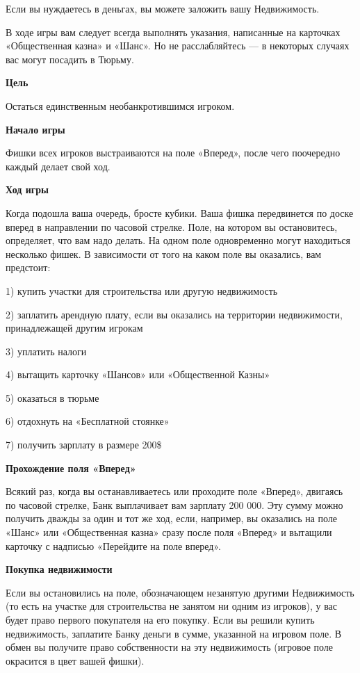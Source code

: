Если вы нуждаетесь в деньгах, вы можете заложить вашу Недвижимость.

В ходе игры вам следует всегда выполнять указания, написанные на карточках «Общественная казна» и «Шанс». Но не расслабляйтесь — в некоторых случаях вас могут посадить в Тюрьму.

{\bf Цель}

Остаться единственным необанкротившимся игроком.

{\bf Начало игры}

Фишки всех игроков выстраиваются на поле «Вперед», после чего поочередно каждый делает свой ход.

{\bf Ход игры}

Когда подошла ваша очередь, бросте кубики. Ваша фишка передвинется по доске вперед в направлении по часовой стрелке. Поле, на котором вы остановитесь, определяет, что вам надо делать. На одном поле одновременно могут находиться несколько фишек. В зависимости от того на каком поле вы оказались, вам предстоит:

1) купить участки для строительства или другую недвижимость

2) заплатить арендную плату, если вы оказались на территории недвижимости, принадлежащей другим игрокам

3) уплатить налоги

4) вытащить карточку «Шансов» или «Общественной Казны»

5) оказаться в тюрьме

6) отдохнуть на «Бесплатной стоянке»

7) получить зарплату в размере 200\$


{\bf Прохождение поля «Вперед»}

Всякий раз, когда вы останавливаетесь или проходите поле «Вперед», двигаясь по часовой стрелке, Банк выплачивает вам зарплату 200 000. Эту сумму можно получить дважды за один и тот же ход, если, например, вы оказались на поле «Шанс» или «Общественная казна» сразу после поля «Вперед» и вытащили карточку с надписью «Перейдите на поле вперед».

{\bf Покупка недвижимости}

Если вы остановились на поле, обозначающем незанятую другими Недвижимость (то есть на участке для строительства не занятом ни одним из игроков), у вас будет право первого покупателя на его покупку. Если вы решили купить недвижимость, заплатите Банку деньги в сумме, указанной на игровом поле. В обмен вы получите право собственности на эту недвижимость (игровое поле окрасится в цвет вашей фишки).

